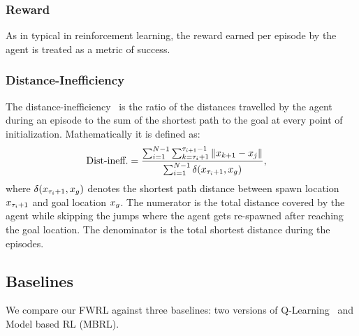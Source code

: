\subsubsection{Reward}
As in typical in reinforcement learning, the reward earned per episode by the
agent is treated as a metric of success.



\subsubsection{Distance-Inefficiency} The distance-inefficiency~\citep{dhiman2018critical} is the ratio of the
      distances travelled by the agent during an episode to the sum of the shortest
      path to the goal at every point of initialization. Mathematically it is defined
      as:
		\begin{align}
			\text{Dist-ineff.} &=
			\frac{ \sum_{i=1}^{N-1} \sum_{k=\tau_i + 1}^{\tau_{i+1} - 1} \|x_{k+1} - x_{j}\| }
			{ \sum_{i=1}^{N-1} \delta(x_{\tau_i + 1}, x_g) } ,
		\end{align}%
		where $\delta(x_{\tau_i +1}, x_g)$ denotes the shortest path
		distance between spawn location $x_{\tau_i+1}$ and goal location
        $x_g$. The numerator is the total distance covered by the agent while
        skipping the jumps where the agent gets re-spawned after reaching the
        goal location. The denominator is the total shortest distance during the
        episodes.

\subsection{Baselines}
We compare our FWRL against three baselines: two versions of
Q-Learning~\cite{watkins1992qlearning} and Model based RL (MBRL).

